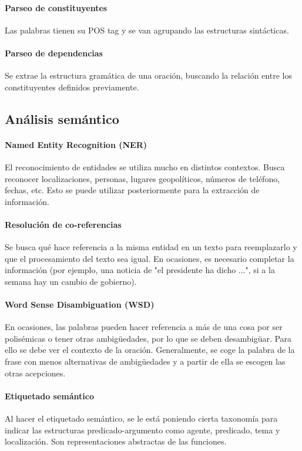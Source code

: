 \paragraph{Parseo de constituyentes}
Las palabras tienen su POS tag y se van agrupando las estructuras sintácticas.

\paragraph{Parseo de dependencias}
Se extrae la estructura gramática de una oración, buscando la relación entre los constituyentes definidos previamente. 

\subsection{Análisis semántico}
\paragraph{Named Entity Recognition (NER)}
El reconocimiento de entidades se utiliza mucho en distintos contextos. Busca reconocer localizaciones, personas, lugares geopolíticos, números de teléfono, fechas, etc. Esto se puede utilizar posteriormente para la extracción de información. 

\paragraph{Resolución de co-referencias}
Se busca qué hace referencia a la misma entidad en un texto para reemplazarlo y que el procesamiento del texto sea igual. En ocasiones, es necesario completar la información (por ejemplo, una noticia de "el presidente ha dicho ...", si a la semana hay un cambio de gobierno).

\paragraph{Word Sense Disambiguation (WSD)}
En ocasiones, las palabras pueden hacer referencia a más de una cosa por ser polisémicas o tener otras ambigüedades, por lo que se deben desambigüar. Para ello se debe ver el contexto de la oración. Generalmente, se coge la palabra de la frase con menos alternativas de ambigüedades y a partir de ella se escogen las otras acepciones.

\paragraph{Etiquetado semántico}
Al hacer el etiquetado semántico, se le está poniendo cierta taxonomía para indicar las estructuras predicado-argumento como agente, predicado, tema y localización. Son representaciones abstractas de las funciones.

